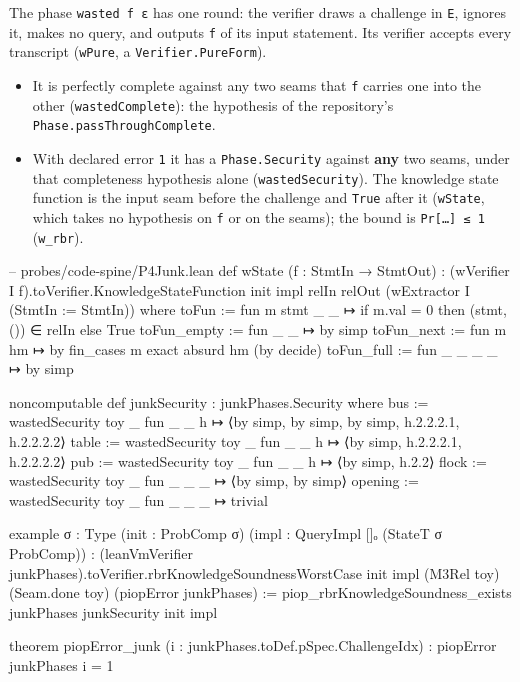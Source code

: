 The phase \texttt{wasted f ε} has one round: the verifier draws a challenge in \texttt{E}, ignores it, makes no query, and outputs \texttt{f} of its input statement. Its verifier accepts every transcript (\texttt{wPure}, a \texttt{Verifier.\allowbreak{}PureForm}).

\begin{itemize}
\item It is perfectly complete against any two seams that \texttt{f} carries one into the other (\texttt{wastedComplete}): the hypothesis of the repository's \texttt{Phase.\allowbreak{}passThroughComplete}.
\item With declared error \texttt{1} it has a \texttt{Phase.\allowbreak{}Security} against \textbf{any} two seams, under that completeness hypothesis alone (\texttt{wastedSecurity}). The knowledge state function is the input seam before the challenge and \texttt{True} after it (\texttt{wState}, which takes no hypothesis on \texttt{f} or on the seams); the bound is \texttt{Pr[…] ≤ 1} (\texttt{w\_\allowbreak{}rbr}).
\end{itemize}

\begin{leancode}
-- probes/code-spine/P4Junk.lean
def wState (f : StmtIn → StmtOut) :
    (wVerifier I f).toVerifier.KnowledgeStateFunction init impl relIn relOut
      (wExtractor I (StmtIn := StmtIn)) where
  toFun := fun m stmt _ _ ↦ if m.val = 0 then (stmt, ()) ∈ relIn else True
  toFun_empty := fun _ _ ↦ by simp
  toFun_next := fun m hm ↦ by
    fin_cases m
    exact absurd hm (by decide)
  toFun_full := fun _ _ _ _ ↦ by simp

noncomputable def junkSecurity : junkPhases.Security where
  bus := wastedSecurity toy _ fun _ _ h ↦ ⟨by simp, by simp, by simp, h.2.2.2.1, h.2.2.2.2⟩
  table := wastedSecurity toy _ fun _ _ h ↦ ⟨by simp, h.2.2.2.1, h.2.2.2.2⟩
  pub := wastedSecurity toy _ fun _ _ h ↦ ⟨by simp, h.2.2⟩
  flock := wastedSecurity toy _ fun _ _ _ ↦ ⟨by simp, by simp⟩
  opening := wastedSecurity toy _ fun _ _ _ ↦ trivial

example {σ : Type} (init : ProbComp σ) (impl : QueryImpl []ₒ (StateT σ ProbComp)) :
    (leanVmVerifier junkPhases).toVerifier.rbrKnowledgeSoundnessWorstCase init impl (M3Rel toy)
      (Seam.done toy) (piopError junkPhases) :=
  piop_rbrKnowledgeSoundness_exists junkPhases junkSecurity init impl

theorem piopError_junk (i : junkPhases.toDef.pSpec.ChallengeIdx) : piopError junkPhases i = 1
\end{leancode}

